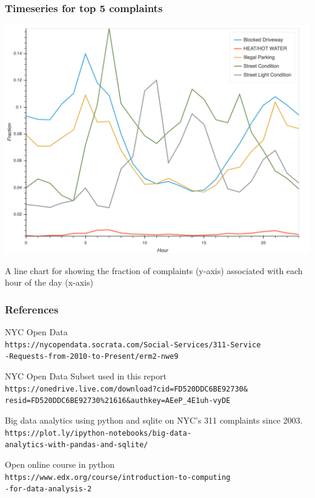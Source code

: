 \documentclass[10pt]{beamer}
\begin{document}
\begin{frame} \frametitle{Timeseries for top 5 complaints}
\includegraphics[scale=0.17]{timeseries}

A line chart for showing the fraction of complaints (y-axis) associated with each hour of the day (x-axis)
\end{frame}

\begin{frame} \frametitle{References}
\begin{thebibliography}{9}
NYC Open Data
\\\texttt{https://nycopendata.socrata.com/Social-Services/311-Service\\-Requests-from-2010-to-Present/erm2-nwe9}

NYC Open Data Subset used in this report
\\\texttt{https://onedrive.live.com/download?cid=FD520DDC6BE92730\&\\resid=FD520DDC6BE92730\%21616\&authkey=AEeP\_4E1uh-vyDE}

Big data analytics using python and sqlite on NYC's 311 complaints since 2003.
\\\texttt{https://plot.ly/ipython-notebooks/big-data-\\analytics-with-pandas-and-sqlite/}


Open online course in python
\\\texttt{https://www.edx.org/course/introduction-to-computing\\-for-data-analysis-2}

\end{thebibliography}

\end{frame}
\end{document}
